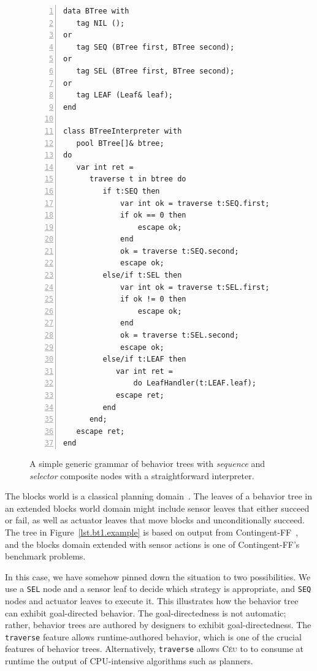 \documentclass{sig-alternate}
\newcommand{\CEU}{\textsc{C\'{e}u}\xspace}
\newcommand{\code}[1] {{\small{\texttt{#1}}}}
\begin{document}
\begin{figure}[t]
\begin{lstlisting}[numbers=left,xleftmargin=3em]
data BTree with
   tag NIL ();
or
   tag SEQ (BTree first, BTree second);
or
   tag SEL (BTree first, BTree second);
or
   tag LEAF (Leaf& leaf);
end

class BTreeInterpreter with
   pool BTree[]& btree;
do
   var int ret =
      traverse t in btree do
         if t:SEQ then
             var int ok = traverse t:SEQ.first;
             if ok == 0 then
                 escape ok;
             end
             ok = traverse t:SEQ.second;
             escape ok;
         else/if t:SEL then
             var int ok = traverse t:SEL.first;
             if ok != 0 then
                 escape ok;
             end
             ok = traverse t:SEL.second;
             escape ok;
         else/if t:LEAF then
            var int ret =
                do LeafHandler(t:LEAF.leaf);
            escape ret;
         end
      end;
   escape ret;
end
\end{lstlisting}
\caption{
A simple generic grammar of behavior trees with \emph{sequence} and 
\emph{selector} composite nodes with a straightforward interpreter.
\label{lst.bt1}
}
\end{figure}

The blocks world is a classical planning domain~\cite{slaney2001blocks}.
The leaves of a behavior tree in an extended blocks world domain
might include sensor leaves that either succeed or fail,
as well as actuator leaves that move blocks and unconditionally succeed.
The tree in Figure~\ref{lst.bt1.example} is based on output from Contingent-FF~\cite{hoffmann2005contingent},
and the blocks domain extended with sensor actions is one of Contingent-FF's benchmark problems.

In this case, we have somehow pinned down the
situation to two possibilities.
%
We use a \code{SEL} node and a sensor leaf to decide which strategy is appropriate,
and \code{SEQ} nodes and actuator leaves to execute it.
This illustrates how the behavior tree can exhibit goal-directed behavior.
The goal-directedness is not automatic; rather, behavior trees are authored
by designers to exhibit goal-directedness.
The \code{traverse} feature allows runtime-authored behavior, 
which is one of the crucial features of behavior trees.
Alternatively, \code{traverse} allows \CEU to
to consume at runtime the output of CPU-intensive algorithms such as planners.
\end{document}
